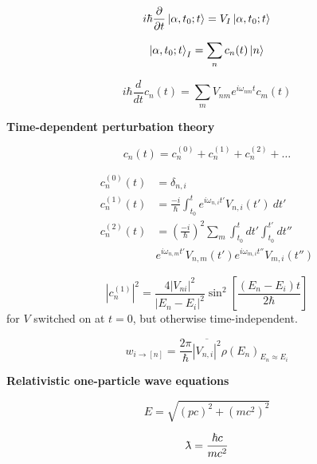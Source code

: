\documentclass[11pt]{article}
\newcommand{\lambdabar}{{\mkern0.75mu\mathchar '26\mkern -9.75mu\lambda}}
\begin{document}
\begin{multicols}{2}
\begin{equation} %
i\hbar \frac{\partial}{\partial t} \ket{\alpha,t_0;t} = V_I \ket{\alpha,t_0;t}
\end{equation}

\begin{equation} %
\ket{\alpha,t_0;t}_I = \sum_n c_n(t) \ket{n}
\end{equation}

\begin{equation} %
i\hbar \frac{d}{dt} c_n(t)  = \sum_m V_{nm} e^{i\omega_{nm}t}c_m(t)
\end{equation}

{\bf Time-dependent perturbation theory}

\begin{equation}
c_n(t) = c_n^{(0)} + c_n^{(1)} + c_n^{(2)} + \dots
\end{equation}

\begin{align}
c_n^{(0)}(t) & = \delta_{n,i} \\
c_n^{(1)}(t) & = \frac{-i}{\hbar}
  \int_{t_0}^t e^{i\omega_{n,i}t'} V_{n,i}(t') \: dt' \\
c_n^{(2)}(t) & = \left( \frac{-i}{\hbar} \right)^2
\sum_m \int_{t_0}^{t} dt' \int_{t_0}^{t'} dt''  \nonumber \\
&
e^{i\omega_{n,m}t'} V_{n,m}(t') e^{i\omega_{m,i}t''} V_{m,i}(t'')
\end{align}


\begin{equation}
|c_n^{(1)}|^2 =
  \frac{4|V_{ni}|^2}{|E_n-E_i|^2} \sin^2
    \left [
      \frac{(E_n-E_i)t}{2\hbar}
    \right ]
\end{equation}
{\footnotesize for $V$ switched on at $t=0$, but otherwise time-independent.}

\begin{equation}
w_{i\rightarrow [n]} =
\frac{2\pi}{\hbar} \overline{|V_{n,i}|^2} \rho(E_n)_{E_n \approx E_i}
\end{equation}

{\bf Relativistic one-particle wave equations}

\begin{equation}
E = \sqrt{(pc)^2+(mc^2)^2}
\end{equation}

\begin{equation}
\lambdabar = \frac{\hbar c}{mc^2}
\end{equation}


\end{multicols}
\end{document}
